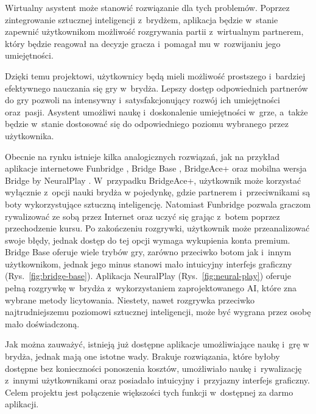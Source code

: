 Wirtualny asystent może stanowić rozwiązanie dla tych problemów. Poprzez
zintegrowanie sztucznej inteligencji z~brydżem, aplikacja będzie w~stanie
zapewnić użytkownikom możliwość
rozgrywania partii z~wirtualnym partnerem, który będzie reagował na decyzje
gracza i~pomagał mu w~rozwijaniu jego umiejętności.

Dzięki temu projektowi, użytkownicy będą mieli możliwość prostszego i~bardziej
efektywnego nauczania się gry w~brydża. Lepszy dostęp odpowiednich partnerów
do gry pozwoli na intensywny i~satysfakcjonujący rozwój ich
umiejętności oraz~pasji. Asystent umożliwi naukę
i~doskonalenie umiejętności w~grze, a~także będzie w~stanie dostosować
się do odpowiedniego poziomu wybranego przez użytkownika.
\newline

Obecnie na rynku istnieje kilka analogicznych rozwiązań, jak na przykład
aplikacje internetowe Funbridge \cite{funbridge}, Bridge Base \cite{bridgebase},
BridgeAce+ \cite{bridgeace} oraz mobilna wersja Bridge by NeuralPlay
\cite{neuralplay}. W~przypadku BridgeAce+, użytkownik może korzystać wyłącznie
z~opcji nauki brydża w pojedynkę, gdzie partnerem i~przeciwnikami są boty
wykorzystujące sztuczną inteligencję. Natomiast Funbridge pozwala graczom
rywalizować ze sobą przez Internet oraz uczyć się grając z~botem poprzez
przechodzenie kursu. Po zakończeniu rozgrywki, użytkownik może przeanalizować
swoje błędy, jednak dostęp do tej opcji wymaga wykupienia konta premium.
Bridge Base oferuje wiele trybów gry, zarówno przeciwko botom jak i~innym
użytkownikom, jednak jego minus stanowi mało intuicyjny interfejs graficzny
(Rys.~\ref{fig:bridge-base}). Aplikacja NeuralPlay (Rys.~\ref{fig:neural-play})
oferuje pełną rozgrywkę w~brydża
z~wykorzystaniem zaprojektowanego AI, które zna wybrane metody licytowania.
Niestety, nawet rozgrywka przeciwko najtrudniejszemu poziomowi sztucznej
inteligencji, może być wygrana przez osobę mało doświadczoną.
\newline

Jak można zauważyć, istnieją już dostępne aplikacje umożliwiające naukę
i~grę w brydża, jednak mają one istotne wady. Brakuje rozwiązania, które
byłoby dostępne bez konieczności ponoszenia kosztów, umożliwiało naukę
i~rywalizację z~innymi użytkownikami oraz posiadało intuicyjny i~przyjazny
interfejs graficzny. Celem projektu jest połączenie większości tych funkcji
w~dostępnej za darmo aplikacji.



\FloatBarrier


